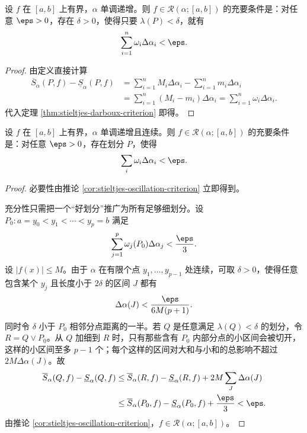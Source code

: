 \begin{corollary}\label{cor:stieltjes-oscillation-criterion}
	设 $f$ 在 $[a,b]$ 上有界，$\alpha$ 单调递增。则 $f\in\mathcal R(\alpha;[a,b])$ 的充要条件是：对任意 $\eps>0$，存在 $\delta>0$，使得只要 $\lambda(P)<\delta$，就有
	\[
	\sum_{i=1}^n\omega_i\Delta\alpha_i<\eps.
	\]
\end{corollary}

\begin{proof}
	由定义直接计算
	\[
	\begin{aligned}
		\overline S_\alpha(P,f)-\underline S_\alpha(P,f)
		&=\sum_{i=1}^n M_i\Delta\alpha_i-
		\sum_{i=1}^n m_i\Delta\alpha_i \\
		&=\sum_{i=1}^n (M_i-m_i)\Delta\alpha_i
		=\sum_{i=1}^n \omega_i\Delta\alpha_i.
	\end{aligned}
	\]
	代入定理 \ref{thm:stieltjes-darboux-criterion} 即得。
\end{proof}

\begin{corollary}\label{cor:stieltjes-one-partition-criterion}
	设 $f$ 在 $[a,b]$ 上有界，$\alpha$ 单调递增且连续。则 $f\in\mathcal R(\alpha;[a,b])$ 的充要条件是：对任意 $\eps>0$，存在划分 $P$，使得
	\[
	\sum_i\omega_i\Delta\alpha_i<\eps.
	\]
\end{corollary}

\begin{proof}
	必要性由推论 \ref{cor:stieltjes-oscillation-criterion} 立即得到。
	
	充分性只需把一个“好划分”推广为所有足够细划分。设 $P_0:a=y_0<y_1<\cdots<y_p=b$ 满足
	\[
	\sum_{j=1}^p\omega_j(P_0)\Delta\alpha_j<\frac\eps3.
	\]
	设 $|f(x)|\leq M$。由于 $\alpha$ 在有限个点 $y_1,\dots,y_{p-1}$ 处连续，可取 $\delta>0$，使得任意包含某个 $y_j$ 且长度小于 $2\delta$ 的区间 $J$ 都有
	\[
	\Delta\alpha(J)<\frac{\eps}{6M(p+1)}.
	\]
	同时令 $\delta$ 小于 $P_0$ 相邻分点距离的一半。若 $Q$ 是任意满足 $\lambda(Q)<\delta$ 的划分，令 $R=Q\vee P_0$。从 $Q$ 加细到 $R$ 时，只有那些含有 $P_0$ 内部分点的小区间会被切开，这样的小区间至多 $p-1$ 个；每个这样的区间对大和与小和的总影响不超过 $2M\Delta\alpha(J)$。故
	\[
	\begin{aligned}
		\overline S_\alpha(Q,f)-\underline S_\alpha(Q,f)
		&\leq \overline S_\alpha(R,f)-\underline S_\alpha(R,f)
		+2M\sum_J\Delta\alpha(J) \\
		&\leq \overline S_\alpha(P_0,f)-\underline S_\alpha(P_0,f)+\frac{\eps}{3}<\eps.
	\end{aligned}
	\]
	由推论 \ref{cor:stieltjes-oscillation-criterion}，$f\in\mathcal R(\alpha;[a,b])$。
\end{proof}

